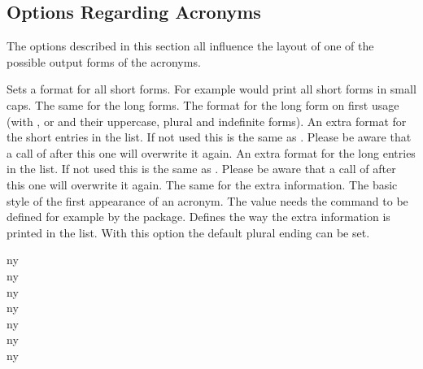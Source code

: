 \documentclass[DIV10,toc=index,toc=bib,hyperfootnotes=false]{cnpkgdoc}
\makeatletter
\newcommand*\sinceversion[1]{%
  \@bsphack
  \marginnote{%
    \footnotesize\sffamily\RaggedRight
    \textcolor{black!75}{Introduced in version~#1}}%
  \@esphack}
\newcommand*\changedversion[1]{%
  \@bsphack
  \marginnote{%
    \footnotesize\sffamily\RaggedRight
    \textcolor{black!75}{Changed in version~#1}}%
  \@esphack}
\makeatother
\begin{document}
\subsection{Options Regarding Acronyms}
The options described in this section all influence the layout of one of the
possible output forms of the acronyms.
\begin{beschreibung}
 \Default
   Sets a format for all short forms. For example 
   would print all short forms in small caps.
 \Default
   The same for the long forms.
 \Default
   \sinceversion{1.2}%
   The format for the long form on first usage (with ,  or
    and their uppercase, plural and indefinite forms).
 \Default
   \sinceversion{1.1}An extra format for the short entries in the list. If not
   used this is the same as . Please be aware that a call of
    after this one will overwrite it again.
 \Default
   An extra format for the long entries in the list. If not used this is the same
   as . Please be aware that a call of  after
   this one will overwrite it again.
 \Default
   The same for the extra information.
   \changedversion{1.1}The basic style of the first appearance of an acronym.
   The value  needs the command  to be defined for
   example by the  package.
   Defines the way the extra information is printed in the list.
   With this option the default plural ending can be set.
\end{beschreibung}

\begin{beispiel}
 \acf{ny} \\
 \acf{ny} \\
 \acf{ny} \\
 \acf{ny} \\
 \acf{ny} \\
 \acf{ny} \\
 \acf{ny}
\end{beispiel}
\end{document}
